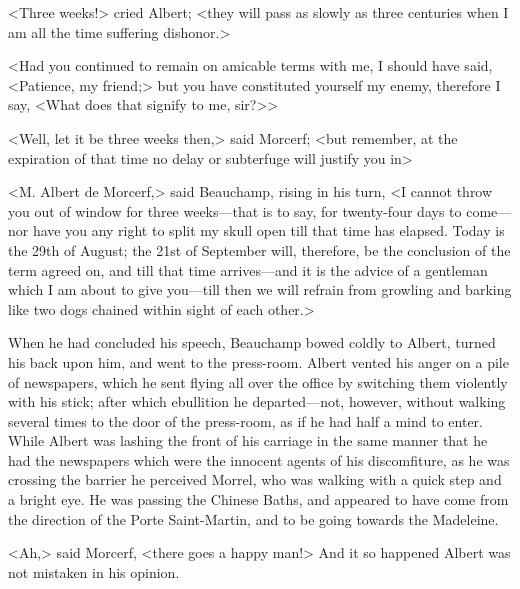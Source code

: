  <Three weeks!> cried Albert; <they will pass as slowly as three centuries when I am all the time suffering dishonor.> 

 <Had you continued to remain on amicable terms with me, I should have said, <Patience, my friend;> but you have constituted yourself my enemy, therefore I say, <What does that signify to me, sir?>> 

 <Well, let it be three weeks then,> said Morcerf; <but remember, at the expiration of that time no delay or subterfuge will justify you in\longdash> 

 <M. Albert de Morcerf,> said Beauchamp, rising in his turn, <I cannot throw you out of window for three weeks—that is to say, for twenty-four days to come—nor have you any right to split my skull open till that time has elapsed. Today is the 29th of August; the 21st of September will, therefore, be the conclusion of the term agreed on, and till that time arrives—and it is the advice of a gentleman which I am about to give you—till then we will refrain from growling and barking like two dogs chained within sight of each other.> 

 When he had concluded his speech, Beauchamp bowed coldly to Albert, turned his back upon him, and went to the press-room. Albert vented his anger on a pile of newspapers, which he sent flying all over the office by switching them violently with his stick; after which ebullition he departed—not, however, without walking several times to the door of the press-room, as if he had half a mind to enter.  While Albert was lashing the front of his carriage in the same manner that he had the newspapers which were the innocent agents of his discomfiture, as he was crossing the barrier he perceived Morrel, who was walking with a quick step and a bright eye. He was passing the Chinese Baths, and appeared to have come from the direction of the Porte Saint-Martin, and to be going towards the Madeleine. 

 <Ah,> said Morcerf, <there goes a happy man!> And it so happened Albert was not mistaken in his opinion. 